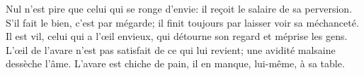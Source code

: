 Nul n’est pire que celui qui se ronge d’envie:
	il reçoit le salaire de sa perversion.
S’il fait le bien, c’est par mégarde;
	il finit toujours par laisser voir sa méchanceté.
Il est vil, celui qui a l’œil envieux, qui détourne son regard et méprise les gens.
L’œil de l’avare n’est pas satisfait de ce qui lui revient;
	une avidité malsaine dessèche l’âme.
L’avare est chiche de pain, il en manque, lui-même, à sa table.
